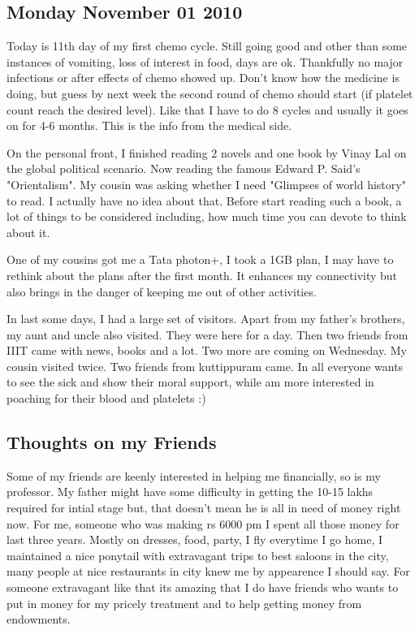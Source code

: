 \vskip 2pt

\subsection*{Monday November 01 2010}

Today is 11th day of my first chemo cycle. Still going good and other
than some instances of vomiting, loss of interest in food, days are ok.
Thankfully no major infections or after effects of chemo showed up. 
Don't know how the medicine is doing, but guess by next week the second 
round of chemo should start (if platelet count reach the desired level). 
Like that I have to do 8 cycles and usually it goes on for 4-6 months. 
This is the info from the medical side.

On the personal front, I finished reading 2 novels and one book by Vinay 
Lal on the global political scenario. Now reading the famous Edward P. Said's 
"Orientalism". My cousin was asking whether I need "Glimpses of world history" 
to read. I actually have no idea about that. Before start reading such a book, 
a lot of things to be considered including, how much time you can devote to 
think about it. 

One of my cousins got me a Tata photon+, I took a 1GB plan, I may have to rethink 
about the plans after the first month. It enhances my connectivity but also brings 
in the danger of keeping me out of other activities.

In last some days, I had a large set of visitors. Apart from my father's brothers,
my aunt and uncle also visited. They were here for a day. Then two friends from IIIT 
came with news, books and a lot. Two more are coming on Wednesday. My cousin visited 
twice. Two friends from kuttippuram came. In all everyone wants to see the sick and 
show their moral support, while am more interested in poaching for their blood and 
platelets :) 

\subsection*{Thoughts on my Friends}

Some of my friends are keenly interested in helping me financially, so is my professor. 
My father might have some difficulty in getting the 10-15 lakhs required for intial stage 
but, that doesn't mean he is all in need of money right now. For me, someone who was making 
rs 6000 pm I spent all those money for last three years. Mostly on dresses, food, party, 
I fly everytime I go home, I maintained a nice ponytail with extravagant trips to best 
saloons in the city, many people at nice restaurants in city knew me by appearence I should say. 
For someone extravagant like that its amazing that I do have friends who wants to put in money 
for my pricely treatment and to help getting money from endowments. 

